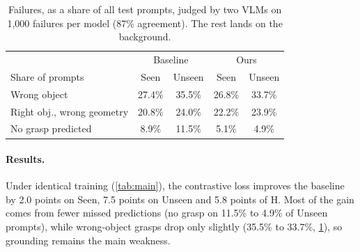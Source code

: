 \begin{table}[t]
  \centering
  \small
  \setlength{\tabcolsep}{4pt}
  \begin{tabular}{@{}lcccc@{}}
    \toprule
    & \multicolumn{2}{c}{Baseline} & \multicolumn{2}{c}{Ours} \\
    Share of prompts & Seen & Unseen & Seen & Unseen \\
    \midrule
    Wrong object & 27.4\% & 35.5\% & 26.8\% & 33.7\% \\
    Right obj., wrong geometry & 20.8\% & 24.0\% & 22.2\% & 23.9\% \\
    No grasp predicted & 8.9\% & 11.5\% & 5.1\% & 4.9\% \\
    \bottomrule
  \end{tabular}
  \caption{Failures, as a share of all test prompts, judged by two VLMs on 1,000 failures per model (87\% agreement). The rest lands on the background.}
  \label{tab:errors}
\end{table}

\paragraph{Results.}
Under identical training (\cref{tab:main}), the contrastive loss improves the baseline by 2.0 points on Seen, 7.5 points on Unseen and 5.8 points of H.
Most of the gain comes from fewer missed predictions (no grasp on 11.5\% to 4.9\% of Unseen prompts), while wrong-object grasps drop only slightly (35.5\% to 33.7\%, \cref{tab:errors}), so grounding remains the main weakness.

